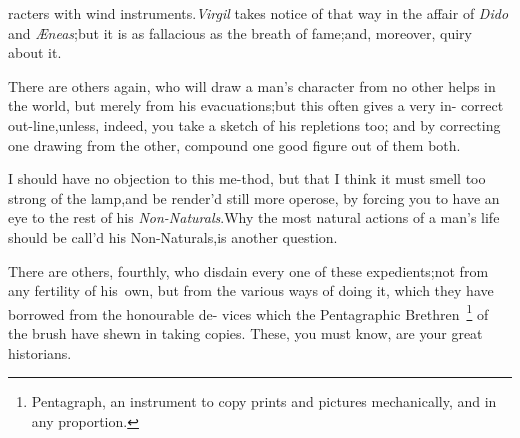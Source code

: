 \documentclass{article}
\begin{document}
\noindent
{}
racters with wind instruments.\tsk \textit{Virgil} takes notice
of that way in the affair of \textit{Dido} and
\textit{Æneas};\tsk but it is as fallacious as the breath of
fame;\tsk and, moreover,
quiry about it.

There are others again, who will draw a man’s character
from no other helps in the world, but merely from his
evacuations;\tsk but this often gives a very in-
correct out-line,\tsk unless, indeed, you\break
take a sketch of his repletions too; and\break
by correcting one drawing from the\break
other, compound one good figure out of\break
them both.

I should have no objection to this me-\break thod, but that I think it
must smell too strong of the lamp,\tsk and be render’d
still more operose, by forcing you to have an eye to the rest of
his \textit{Non-Naturals}.\tsk\break Why the most natural actions of a
man’s life should be call’d his Non-Naturals,\tsk\break is
another question.

There are others, fourthly, who disdain every one of these expedients;\tsk not from
any fertility of his\sic\ own, but from the various ways of doing it, which they have
borrowed from the honourable de- vices which the Pentagraphic
Brethren~\footnote{\enspace Pentagraph, \vrule width 0pt height 16pt
an instrument to copy prints and pictures
mechanically, and in any proportion.} of the brush have shewn in
taking co\-pies.\tsk 
These, you must know, are your great historians.

\noindent
{}
\end{document}
